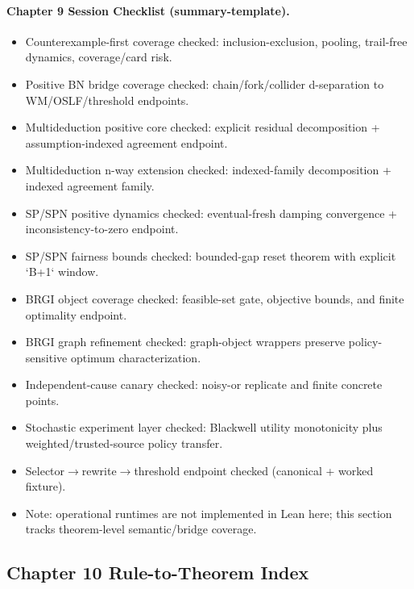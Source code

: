 \documentclass[]{article}
\begin{document}
\paragraph{Chapter 9 Session Checklist (summary-template).}
\begin{itemize}
\item Counterexample-first coverage checked: inclusion-exclusion, pooling, trail-free dynamics, coverage/card risk.
\item Positive BN bridge coverage checked: chain/fork/collider d-separation to WM/OSLF/threshold endpoints.
\item Multideduction positive core checked: explicit residual decomposition + assumption-indexed agreement endpoint.
\item Multideduction n-way extension checked: indexed-family decomposition + indexed agreement family.
\item SP/SPN positive dynamics checked: eventual-fresh damping convergence + inconsistency-to-zero endpoint.
\item SP/SPN fairness bounds checked: bounded-gap reset theorem with explicit `B+1` window.
\item BRGI object coverage checked: feasible-set gate, objective bounds, and finite optimality endpoint.
\item BRGI graph refinement checked: graph-object wrappers preserve policy-sensitive optimum characterization.
\item Independent-cause canary checked: noisy-or replicate and finite concrete points.
\item Stochastic experiment layer checked: Blackwell utility monotonicity plus weighted/trusted-source policy transfer.
\item Selector$\to$rewrite$\to$threshold endpoint checked (canonical + worked fixture).
\item Note: operational runtimes are not implemented in Lean here; this section tracks theorem-level semantic/bridge coverage.
\end{itemize}

\subsection{Chapter 10 Rule-to-Theorem Index}
\label{app:ch10-theorem-index}
\end{document}
